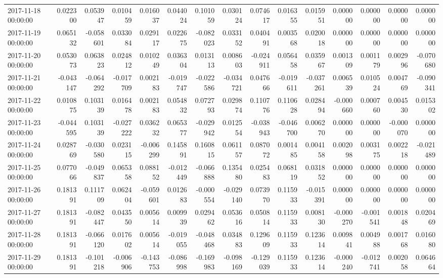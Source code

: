 \begin{tabular}{lrrrrrrrrrrrrrr}
2017-11-18 00:00:00 & 0.022300 & 0.053947 & 0.010459 & 0.016037 & 0.044024 & 0.101059 & 0.030124 & 0.074617 & 0.016355 & 0.015951 & 0.000000 & 0.000000 & 0.000000 & 0.000000 \\
2017-11-19 00:00:00 & 0.065132 & -0.058601 & 0.033084 & 0.029117 & 0.022675 & -0.082023 & 0.033152 & 0.040491 & 0.003568 & 0.020018 & 0.000000 & 0.000000 & 0.000000 & 0.000000 \\
2017-11-20 00:00:00 & 0.053073 & 0.063823 & 0.024812 & 0.010249 & 0.036304 & 0.013113 & 0.008603 & -0.024911 & 0.056458 & 0.035967 & 0.001309 & 0.001179 & 0.002996 & -0.070680 \\
2017-11-21 00:00:00 & -0.043147 & -0.064292 & -0.017709 & 0.002183 & -0.019747 & -0.022586 & -0.034721 & 0.047666 & -0.019611 & -0.037261 & 0.006539 & 0.010524 & 0.004769 & -0.090341 \\
2017-11-22 00:00:00 & 0.010875 & 0.103139 & 0.016478 & 0.002183 & 0.054832 & 0.072793 & 0.029874 & 0.110776 & 0.110628 & 0.028494 & -0.000660 & 0.000760 & 0.004530 & 0.015302 \\
2017-11-23 00:00:00 & -0.044595 & 0.103139 & -0.027222 & 0.036232 & 0.065377 & -0.029942 & 0.012554 & -0.038943 & -0.046700 & 0.006270 & 0.000000 & 0.000000 & -0.000070 & 0.000000 \\
2017-11-24 00:00:00 & 0.028769 & -0.030580 & 0.023115 & -0.006299 & 0.145891 & 0.160815 & 0.061157 & 0.087072 & 0.001485 & 0.004158 & 0.002098 & 0.003175 & 0.002218 & -0.021489 \\
2017-11-25 00:00:00 & 0.077066 & -0.049837 & 0.065358 & 0.088152 & -0.012449 & -0.066888 & 0.135480 & 0.025483 & 0.068119 & 0.031852 & 0.000000 & 0.000000 & 0.000000 & 0.000000 \\
2017-11-26 00:00:00 & 0.181391 & 0.111709 & 0.062404 & -0.059601 & 0.012683 & -0.000554 & -0.029140 & 0.073970 & 0.115933 & -0.015391 & 0.000000 & 0.000000 & 0.000000 & 0.000000 \\
2017-11-27 00:00:00 & 0.181391 & -0.082447 & 0.043550 & 0.005614 & 0.009939 & 0.029462 & 0.053616 & 0.050814 & 0.115933 & 0.008130 & -0.000270 & -0.001541 & 0.001848 & 0.020469 \\
2017-11-28 00:00:00 & 0.181391 & -0.066120 & 0.017602 & 0.005614 & -0.019055 & -0.048468 & 0.034883 & 0.129609 & 0.115933 & 0.123614 & 0.009841 & 0.004988 & 0.001768 & 0.016080 \\
2017-11-29 00:00:00 & 0.181391 & -0.101218 & -0.006906 & -0.143753 & -0.086998 & -0.169983 & -0.098169 & -0.129039 & 0.115933 & 0.123614 & -0.000240 & -0.012741 & 0.002058 & 0.064664 \\

\end{tabular}
